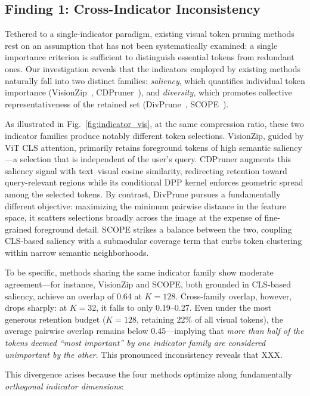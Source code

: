 \subsection{Finding 1: Cross-Indicator Inconsistency}
\label{sec:finding1}

Tethered to a single-indicator paradigm, existing visual token pruning methods rest on an assumption that has not been systematically examined: a single importance criterion is sufficient to distinguish essential tokens from redundant ones.
Our investigation reveals that the indicators employed by existing methods naturally fall into two distinct families: \textit{saliency}, which quantifies individual token importance (VisionZip~\cite{visionzip}, CDPruner~\cite{cdpruner}), and \textit{diversity}, which promotes collective representativeness of the retained set (DivPrune~\cite{divprune}, SCOPE~\cite{scope}).

As illustrated in Fig.~\ref{fig:indicator_vis}, at the same compression ratio, these two indicator families produce notably different token selections.
VisionZip, guided by ViT CLS attention, primarily retains foreground tokens of high semantic saliency---a selection that is independent of the user's query.
CDPruner augments this saliency signal with text--visual cosine similarity, redirecting retention toward query-relevant regions while its conditional DPP kernel enforces geometric spread among the selected tokens.
By contrast, DivPrune pursues a fundamentally different objective: maximizing the minimum pairwise distance in the feature space, it scatters selections broadly across the image at the expense of fine-grained foreground detail.
SCOPE strikes a balance between the two, coupling CLS-based saliency with a submodular coverage term that curbs token clustering within narrow semantic neighborhoods.

To be specific, methods sharing the same indicator family show moderate agreement---for instance, VisionZip and SCOPE, both grounded in CLS-based saliency, achieve an overlap of 0.64 at $K{=}128$.
Cross-family overlap, however, drops sharply: at $K{=}32$, it falls to only 0.19--0.27.
Even under the most generous retention budget ($K{=}128$, retaining 22\% of all visual tokens), the average pairwise overlap remains below 0.45---implying that \emph{more than half of the tokens deemed ``most important'' by one indicator family are considered unimportant by the other}.
This pronounced inconsistency reveals that XXX.

This divergence arises because the four methods optimize along fundamentally \textit{orthogonal indicator dimensions}:

